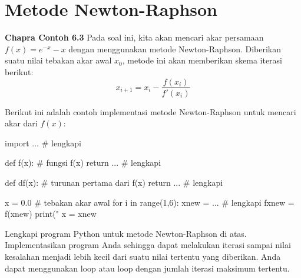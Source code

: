 \section{Metode Newton-Raphson}

\textbf{Chapra Contoh 6.3}
Pada soal ini, kita akan mencari akar persamaan $f(x) = e^{-x} - x$ dengan
menggunakan metode Newton-Raphson. Diberikan suatu nilai tebakan akar
awal $x_{0}$, metode ini akan memberikan skema iterasi berikut:
\begin{equation}
x_{i+1} = x_{i} - \frac{f(x_{i})}{f'(x_{i})}
\label{eq:newton_raphson_1}
\end{equation}

Berikut ini adalah contoh implementasi metode Newton-Raphson untuk
mencari akar dari $f(x)$:
\begin{pythoncode}
import ... # lengkapi

def f(x): # fungsi f(x)
    return ...  # lengkapi
    
def df(x): # turunan pertama dari f(x)
    return ... # lengkapi

x = 0.0 # tebakan akar awal
for i in range(1,6):
    xnew = ... # lengkapi
    fxnew = f(xnew)
    print("%
    x = xnew    
\end{pythoncode}

\begin{soal}
Lengkapi program Python untuk metode Newton-Raphson di atas.
Implementasikan program Anda sehingga
dapat melakukan iterasi sampai nilai kesalahan menjadi lebih kecil dari
suatu nilai tertentu yang diberikan. Anda dapat menggunakan loop 
atau loop  dengan jumlah iterasi maksimum tertentu.
\end{soal}
